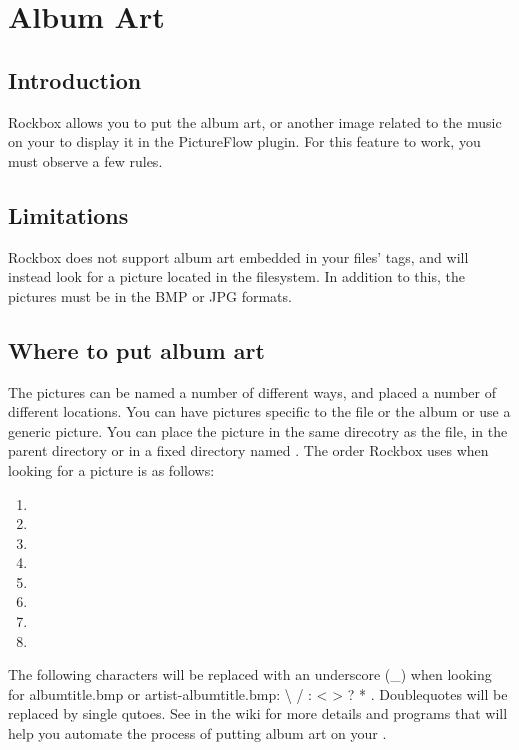 \chapter{\label{ref:album_art}Album Art}
\section{Introduction}

Rockbox allows you to put the album art, or another image related to the music
on your \dap to display it in the PictureFlow plugin. For this feature to work, you must observe a few rules.

\section{Limitations}

Rockbox does not support album art embedded in your files' tags, and will
instead look for a picture located in the filesystem. In addition to this, the
pictures must be in the BMP or JPG formats.

\section{Where to put album art}

The pictures can be named a number of different ways, and placed a number of
different locations. You can have pictures specific to the file or the album
or use a generic picture. You can place the picture in the same direcotry
as the file, in the parent directory or in a fixed directory named
. The order Rockbox uses when looking for a picture
is as follows:

\begin{enumerate}
\item  {}
\item  {}
\item  {}
\item  {}
\item  {}
\item  {}
\item  {}
\item  {}
\end{enumerate}

The following characters will be replaced with an underscore (\_) when looking
for albumtitle.bmp or artist-albumtitle.bmp: \textbackslash{} / : \textless{}
\textgreater{} ? * \textbar{}. Doublequotes will be replaced by single qutoes.
See  in the wiki for more details and programs that will
help you automate the process of putting album art on your \dap{}.
